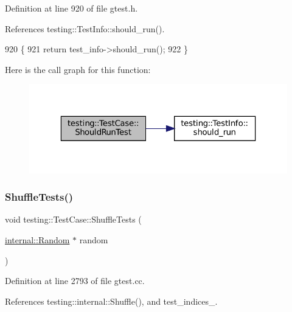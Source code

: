Definition at line 920 of file gtest.\+h.



References testing\+::\+Test\+Info\+::should\+\_\+run().


\begin{DoxyCode}
920                                                        \{
921     \textcolor{keywordflow}{return} test\_info->should\_run();
922   \}
\end{DoxyCode}
Here is the call graph for this function\+:
\nopagebreak
\begin{figure}[H]
\begin{center}
\leavevmode
\includegraphics[width=323pt]{classtesting_1_1TestCase_a75eb139557c43362f94916cfd6762c94_cgraph}
\end{center}
\end{figure}
\mbox{\label{classtesting_1_1TestCase_ac26160e2aeb3d8c86b611843c5abdb29}} 
\subsubsection{\texorpdfstring{Shuffle\+Tests()}{ShuffleTests()}}
{\footnotesize\ttfamily void testing\+::\+Test\+Case\+::\+Shuffle\+Tests (\begin{DoxyParamCaption}\item[{\hyperlink{classtesting_1_1internal_1_1Random}{internal\+::\+Random} $\ast$}]{random }\end{DoxyParamCaption})\hspace{0.3cm}{\ttfamily [private]}}



Definition at line 2793 of file gtest.\+cc.



References testing\+::internal\+::\+Shuffle(), and test\+\_\+indices\+\_\+.



